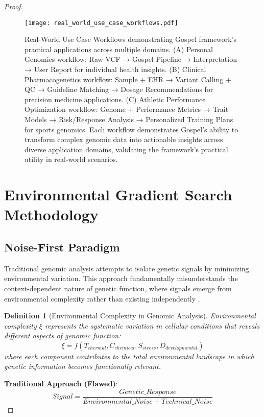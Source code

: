 \documentclass[12pt,a4paper]{article}
\newtheorem{definition}[theorem]{Definition}
\begin{document}
\begin{proof}
\begin{figure}[H]
\centering
\texttt{[image: real\_world\_use\_case\_workflows.pdf]}
\caption{Real-World Use Case Workflows demonstrating Gospel framework's practical applications across multiple domains. (A) Personal Genomics workflow: Raw VCF → Gospel Pipeline → Interpretation → User Report for individual health insights. (B) Clinical Pharmacogenetics workflow: Sample + EHR → Variant Calling + QC → Guideline Matching → Dosage Recommendations for precision medicine applications. (C) Athletic Performance Optimization workflow: Genome + Performance Metrics → Trait Models → Risk/Response Analysis → Personalized Training Plans for sports genomics. Each workflow demonstrates Gospel's ability to transform complex genomic data into actionable insights across diverse application domains, validating the framework's practical utility in real-world scenarios.}
\label{fig:real-world-workflows}
\end{figure}

\section{Environmental Gradient Search Methodology}

\subsection{Noise-First Paradigm}

Traditional genomic analysis attempts to isolate genetic signals by minimizing environmental variation. This approach fundamentally misunderstands the context-dependent nature of genetic function, where signals emerge from environmental complexity rather than existing independently \cite{dunn2011procedures, creek2014metabolome}.

\begin{definition}[Environmental Complexity in Genomic Analysis]
Environmental complexity $\xi$ represents the systematic variation in cellular conditions that reveals different aspects of genomic function:
\begin{equation}
\xi = f(T_{thermal}, C_{chemical}, S_{stress}, D_{developmental})
\end{equation}
where each component contributes to the total environmental landscape in which genetic information becomes functionally relevant.
\end{definition}

\textbf{Traditional Approach (Flawed)}:
\begin{equation}
Signal = \frac{Genetic\_Response}{Environmental\_Noise + Technical\_Noise}
\end{equation}


\end{proof}
\end{document}
